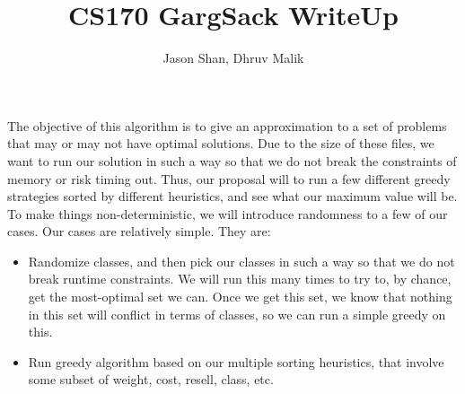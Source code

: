 \documentclass[12pt]{article}
\title{%
CS170 GargSack WriteUp}
\author{Jason Shan, Dhruv Malik}
\begin{document}
\maketitle
\indent The objective of this algorithm is to give an approximation to a set of problems that may or may not have optimal solutions. Due to the size of these files, we want to run our solution in such a way so that we do not break the constraints of memory or risk timing out. Thus, our proposal will to run a few different greedy strategies sorted by different heuristics, and see what our maximum value will be. \\
\indent To make things non-deterministic, we will introduce randomness to a few of our cases. Our cases are relatively simple. They are:
\begin{itemize}
   \item Randomize classes, and then pick our classes in such a way so that we do not break runtime constraints. We will run this many times to try to, by chance, get the most-optimal set we can. Once we get this set, we know that nothing in this set will conflict in terms of classes, so we can run a simple greedy on this.
   \item Run greedy algorithm based on our multiple sorting heuristics, that involve some subset of weight, cost, resell, class, etc.
\end{itemize}
\end{document}
